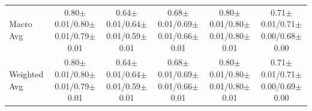 \begin{table}[!t]
{\begin{tabular}{l|cccc|cccc|cccc|cccc|cccc}
Macro Avg & \multicolumn{4}{c|}{0.80$\pm$0.01/0.80$\pm$0.01/0.79$\pm$0.01} & \multicolumn{4}{c|}{0.64$\pm$0.01/0.64$\pm$0.01/0.59$\pm$0.01} & \multicolumn{4}{c|}{0.68$\pm$0.01/0.69$\pm$0.01/0.66$\pm$0.01} & \multicolumn{4}{c|}{0.80$\pm$0.01/0.80$\pm$0.01/0.80$\pm$0.01} & \multicolumn{4}{c}{0.71$\pm$0.01/0.71$\pm$0.00/0.68$\pm$0.00} \\
Weighted Avg & \multicolumn{4}{c|}{0.80$\pm$0.01/0.80$\pm$0.01/0.79$\pm$0.01} & \multicolumn{4}{c|}{0.64$\pm$0.01/0.64$\pm$0.01/0.59$\pm$0.01} & \multicolumn{4}{c|}{0.68$\pm$0.01/0.69$\pm$0.01/0.66$\pm$0.01} & \multicolumn{4}{c|}{0.80$\pm$0.01/0.80$\pm$0.01/0.80$\pm$0.01} & \multicolumn{4}{c}{0.71$\pm$0.01/0.71$\pm$0.00/0.69$\pm$0.00} \\
\bottomrule
\end{tabular}}
\end{table}


